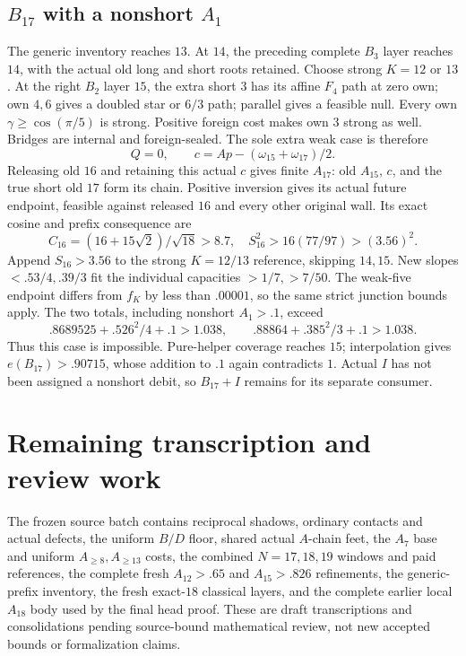 \documentclass[11pt]{article}
\theoremstyle{definition}
\theoremstyle{remark}
\begin{document}
\subsection{\(B_{17}\) with a nonshort \(A_1\)}
The generic inventory reaches \(13\).
At \(14\), the preceding complete \(B_3\)
layer reaches \(14\), with the actual
old long and short roots retained.
Choose strong \(K=12\) or \(13\).
At the right \(B_2\) layer \(15\), the
extra short \(3\) has its affine \(F_4\)
path at zero own; own \(4,6\) gives
a doubled star or \(6/3\) path;
parallel gives a feasible null.
Every own \(\gamma\geq\cos(\pi/5)\)
is strong. Positive foreign cost makes
own \(3\) strong as well.
Bridges are internal and foreign-sealed.
The sole extra weak case is therefore
\[
 Q=0,\qquad c=A p-(\omega_{15}+\omega_{17})/2.
\]
Releasing old \(16\) and retaining this
actual \(c\) gives finite \(A_{17}\):
old \(A_{15}\), \(c\), and the true
short old \(17\) form its chain.
Positive inversion gives its actual
future endpoint, feasible against released
\(16\) and every other original wall.
Its exact cosine and prefix consequence are
\[
 C_{16}=(16+15\sqrt2)/\sqrt{18}>8.7,\quad
 S_{16}^2>16(77/97)>(3.56)^2.
\]
Append \(S_{16}>3.56\) to the strong
\(K=12/13\) reference, skipping \(14,15\).
New slopes \(<.53/4,.39/3\) fit the
individual capacities \(>1/7,>7/50\).
The weak-five endpoint differs from
\(f_K\) by less than \(.00001\), so the
same strict junction bounds apply.
The two totals, including nonshort \(A_1>.1\),
exceed
\[
 .8689525+.526^2/4+.1>1.038,\qquad
 .88864+.385^2/3+.1>1.038.
\]
Thus this case is impossible.
Pure-helper coverage reaches \(15\);
interpolation gives \(e(B_{17})>.90715\),
whose addition to \(.1\) again contradicts \(1\).
Actual \(I\) has not been assigned a
nonshort debit, so \(B_{17}+I\) remains
for its separate consumer.


\section{Remaining transcription and review work}
\label{app:obligations}
The frozen source batch contains reciprocal shadows, ordinary contacts
and actual defects, the uniform \(B/D\) floor, shared actual
\(A\)-chain feet, the \(A_7\) base and uniform \(A_{\geq8},A_{\geq13}\)
costs, the combined \(N=17,18,19\) windows and paid references,
the complete fresh \(A_{12}>.65\) and \(A_{15}>.826\) refinements,
the generic-prefix inventory, the fresh exact-\(18\) classical layers,
and the complete earlier local \(A_{18}\) body used by the final
head proof. These are draft transcriptions and consolidations pending
source-bound mathematical review, not new accepted bounds or
formalization claims.
\end{document}
